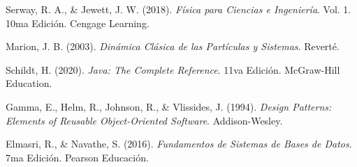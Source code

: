 \documentclass[11pt,a4paper]{article}
\begin{document}
	\begin{enumerate}[label={[ \arabic* ]}]
		\item Serway, R. A., \& Jewett, J. W. (2018). \textit{Física para Ciencias e Ingeniería}. Vol. 1. 10ma Edición. Cengage Learning.
		\item Marion, J. B. (2003). \textit{Dinámica Clásica de las Partículas y Sistemas}. Reverté.
		\item Schildt, H. (2020). \textit{Java: The Complete Reference}. 11va Edición. McGraw-Hill Education.
		\item Gamma, E., Helm, R., Johnson, R., \& Vlissides, J. (1994). \textit{Design Patterns: Elements of Reusable Object-Oriented Software}. Addison-Wesley.
		\item Elmasri, R., \& Navathe, S. (2016). \textit{Fundamentos de Sistemas de Bases de Datos}. 7ma Edición. Pearson Educación.
	\end{enumerate}
	
	
\end{document}
